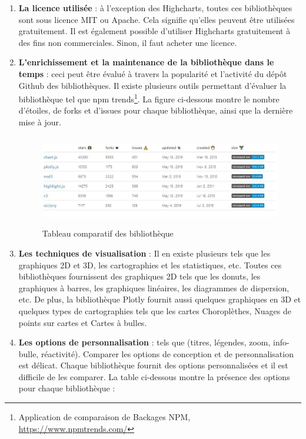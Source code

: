\documentclass[french, a4paper, 12pt]{report}
\begin{document}
\begin{enumerate}
  \item \textbf{La licence utilisée} : à l'exception des Highcharts, toutes ces bibliothèques sont sous licence MIT ou Apache. Cela signifie qu'elles peuvent être utilisées gratuitement. Il est également possible d’utiliser Highcharts gratuitement à des fins non commerciales. Sinon, il faut  acheter une licence.
  \item \textbf{L'enrichissement et la maintenance de la bibliothèque dans le temps} : ceci peut être évalué à travers la popularité et l’activité du dépôt Github des bibliothèques. Il existe plusieurs outils permettant d'évaluer la bibliothèque tel que npm trends\footnote{Application de comparaison de Backages NPM, \url{https://www.npmtrends.com/}}. La figure ci-dessous montre le nombre d'étoiles, de forks  et d’issues pour chaque bibliothèque, ainsi que la dernière mise à jour. 
  \begin{figure}[!ht]
    \centering
    \includegraphics[height=4cm]{images/npm-trends-stat.jpg}
    \caption{Tableau comparatif des bibliothèque}
    \label{fig:3.1}
\end{figure}
  \item \textbf{Les techniques de visualisation} : Il en existe plusieurs tels que les graphiques 2D et 3D, les cartographies et les statistiques, etc. Toutes ces bibliothèques fournissent des graphiques 2D tels que les donuts, les graphiques à barres, les graphiques linéaires, les diagrammes de dispersion, etc. De plus, la bibliothèque Plotly fournit aussi quelques graphiques en 3D et quelques types de cartographies tels que les cartes Choroplèthes, Nuages de points sur cartes et Cartes à bulles.
  \item \textbf{Les options de personnalisation} : tels que (titres, légendes, zoom, info-bulle, réactivité). Comparer les options de conception et de personnalisation est délicat. Chaque bibliothèque fournit des options personnalisées et il est difficile de les comparer. La table ci-dessous montre la présence des options pour chaque bibliothèque :
  \begin{figure}[!ht]

\end{figure}
\end{enumerate}
\end{document}

